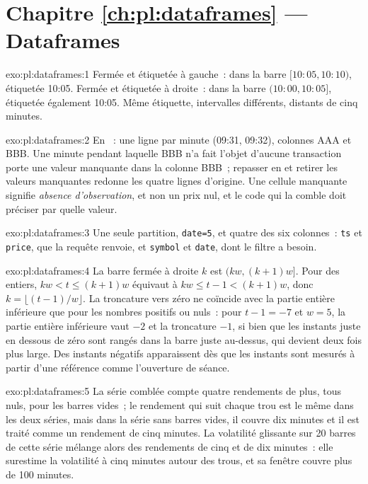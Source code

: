 \section*{Chapitre \ref{ch:pl:dataframes} --- Dataframes}

\begin{solution}{exo:pl:dataframes:1}
Fermée et étiquetée à gauche~: dans la barre $[10\!:\!05, 10\!:\!10)$, étiquetée 10:05. Fermée et étiquetée à droite~: dans la barre
$(10\!:\!00, 10\!:\!05]$, étiquetée également 10:05. Même étiquette, intervalles différents, distants de cinq minutes.
\end{solution}

\begin{solution}{exo:pl:dataframes:2}
En ~: une ligne par minute (09:31, 09:32), colonnes AAA et BBB. Une minute pendant laquelle BBB n'a fait l'objet d'aucune transaction porte une valeur manquante dans la colonne BBB~;
repasser en  et retirer les valeurs manquantes redonne les quatre lignes d'origine. Une cellule manquante signifie \emph{absence d'observation}, et non un prix nul,
et le code qui la comble doit préciser par quelle valeur.
\end{solution}

\begin{solution}{exo:pl:dataframes:3}
Une seule partition, \texttt{date=5}, et quatre des six colonnes~: \texttt{ts} et \texttt{price}, que la requête renvoie, et \texttt{symbol}
et \texttt{date}, dont le filtre a besoin.
\end{solution}

\begin{solution}{exo:pl:dataframes:4}
La barre fermée à droite $k$ est $(kw, (k+1)w]$. Pour des entiers, $kw < t \le (k+1)w$ équivaut à $kw \le t-1 < (k+1)w$, donc $k = \lfloor (t-1)/w \rfloor$.
La troncature vers zéro ne coïncide avec la partie entière inférieure que pour les nombres positifs ou nuls~: pour $t - 1 = -7$ et $w = 5$, la partie entière inférieure vaut $-2$ et la
troncature $-1$, si bien que les instants juste en dessous de zéro sont rangés dans la barre juste au-dessus, qui devient deux fois plus large. Des instants négatifs apparaissent dès que
les instants sont mesurés à partir d'une référence comme l'ouverture de séance.
\end{solution}

\begin{solution}{exo:pl:dataframes:5}
La série comblée compte quatre rendements de plus, tous nuls, pour les barres vides~; le rendement qui suit chaque trou est le même dans les deux séries, mais dans la
série sans barres vides, il couvre dix minutes et il est traité comme un rendement de cinq minutes. La volatilité glissante sur 20 barres de cette série mélange alors
des rendements de cinq et de dix minutes~: elle surestime la volatilité à cinq minutes autour des trous, et sa fenêtre couvre plus de 100 minutes.
\end{solution}

